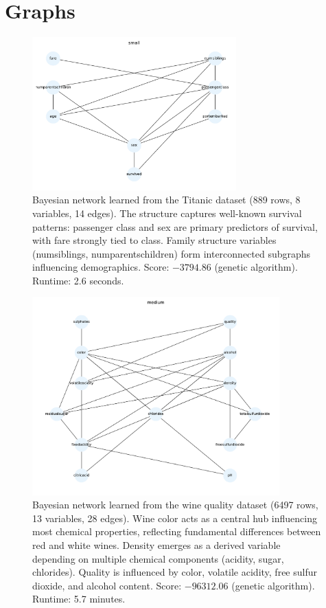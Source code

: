 \documentclass[twoside,11pt]{article}
\begin{document}
\section{Graphs}
\begin{figure}[h]
    \centering
    \includegraphics[width=0.7\textwidth]{small_graph.pdf}
    \caption{Bayesian network learned from the Titanic dataset (889 rows, 8 variables, 14 edges). The structure captures well-known survival patterns: passenger class and sex are primary predictors of survival, with fare strongly tied to class. Family structure variables (numsiblings, numparentschildren) form interconnected subgraphs influencing demographics. Score: $-3794.86$ (genetic algorithm). Runtime: 2.6 seconds.}
\end{figure}

\begin{figure}[h]
    \centering
    \includegraphics[width=0.85\textwidth]{medium_graph.pdf}
    \caption{Bayesian network learned from the wine quality dataset (6497 rows, 13 variables, 28 edges). Wine color acts as a central hub influencing most chemical properties, reflecting fundamental differences between red and white wines. Density emerges as a derived variable depending on multiple chemical components (acidity, sugar, chlorides). Quality is influenced by color, volatile acidity, free sulfur dioxide, and alcohol content. Score: $-96312.06$ (genetic algorithm). Runtime: 5.7 minutes.}
\end{figure}
\end{document}
